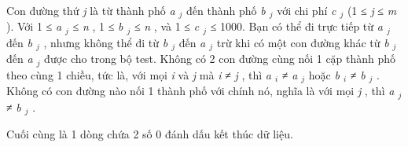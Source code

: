       Con đường thứ      \emph{       j      }      là từ thành phố      \emph{       a       $_        j       $}      đến thành phố      \emph{       b       $_        j       $}      với chi phí      \emph{       c       $_        j       $}      (1 ≤      \emph{       j      }      ≤      \emph{       m      }      ). Với 1 ≤      \emph{       a       $_        j       $}      ≤      \emph{       n      }      , 1 ≤      \emph{       b       $_        j       $}      ≤      \emph{       n      }      , và 1 ≤      \emph{       c       $_        j       $}      ≤ 1000. Bạn có thể đi trực tiếp từ      \emph{       a       $_        j       $}      đến      \emph{       b       $_        j       $}      , nhưng không thể đi từ      \emph{       b       $_        j       $}      đến      \emph{       a       $_        j       $}      trừ khi có một con đường khác từ      \emph{       b       $_        j       $}      đến      \emph{       a       $_        j       $}      được cho trong bộ test. Không có 2 con đường cùng nối 1 cặp thành phố theo cùng 1 chiều, tức là, với mọi      \emph{       i      }      và      \emph{       j      }      mà      \emph{       i      }      ≠      \emph{       j      }      , thì      \emph{       a       $_        i       $}      ≠      \emph{       a       $_        j       $}      hoặc      \emph{       b       $_        i       $}      ≠      \emph{       b       $_        j       $}      . Không có con đường nào nối 1 thành phố với chính nó, nghĩa là với mọi      \emph{       j      }      , thì      \emph{       a       $_        j       $}      ≠      \emph{       b       $_        j       $}      .     

      Cuối cùng là 1 dòng chứa 2 số 0 đánh dấu kết thúc dữ liệu.     

\
